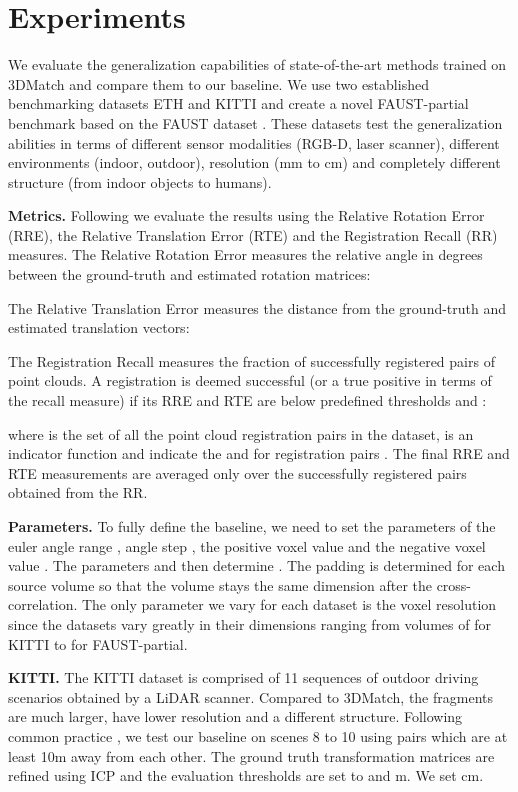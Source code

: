 \documentclass{bmvc2k}
\begin{document}
\section{Experiments} \label{sec:experiments}
We evaluate the generalization capabilities of state-of-the-art methods trained on 3DMatch \cite{3dmatch} and compare them to our baseline. We use two established benchmarking datasets ETH \cite{ETH} and KITTI \cite{KITTI} and create a novel FAUST-partial benchmark based on the FAUST dataset \cite{FAUST}. These datasets test the generalization abilities in terms of different sensor modalities (RGB-D, laser scanner), different environments (indoor, outdoor), resolution (mm to cm) and completely different structure (from indoor objects to humans). 

\textbf{Metrics.} Following \cite{SpinNet,d3feat-joint-learning-of-dense-features,pcam-product-of-cross-attention-matrices,geometric-transformer-for-fast-registration,DGR} we evaluate the results using the Relative Rotation Error (RRE), the Relative Translation Error (RTE) and the Registration Recall (RR) measures. 
The Relative Rotation Error measures the relative angle in degrees between the ground-truth  and estimated  rotation matrices: 

The Relative Translation Error measures the distance from the ground-truth  and estimated  translation vectors:


The Registration Recall measures the fraction of successfully registered pairs of point clouds. 
A registration is deemed successful (or a true positive in terms of the recall measure) if its RRE and RTE are below predefined thresholds  and :


where  is the set of all the point cloud registration pairs  in the dataset,  is an indicator function and  indicate the  and  for registration pairs . The final RRE and RTE measurements are averaged only over the successfully registered pairs  obtained from the RR.

\textbf{Parameters.} To fully define the baseline, we need to set the parameters of the euler angle range , angle step , the positive voxel value  and the negative voxel value . The parameters  and  then determine . The padding  is determined for each source volume  so that the volume stays the same dimension after the cross-correlation. The only parameter we vary for each dataset is the voxel resolution  since the datasets vary greatly in their dimensions ranging from volumes of  for KITTI to  for FAUST-partial.

\textbf{KITTI.} The KITTI dataset \cite{KITTI} is comprised of 11 sequences of outdoor driving scenarios obtained by a LiDAR scanner. Compared to 3DMatch, the fragments are much larger, have lower resolution and a different structure. Following common practice \cite{SpinNet,d3feat-joint-learning-of-dense-features,geometric-transformer-for-fast-registration,predator,fully-convolutional-geometric-features,predator}, we test our baseline on scenes 8 to 10 using pairs which are at least 10m away from each other. The ground truth transformation matrices are refined using ICP and the evaluation thresholds are set to  and m. We set cm.
\end{document}
